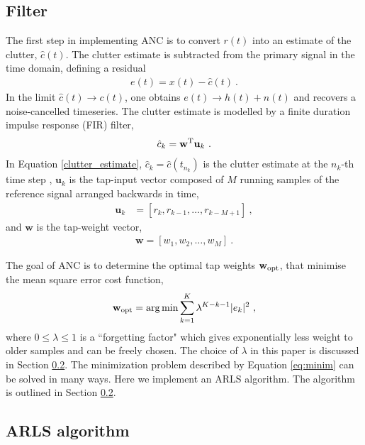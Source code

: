 \documentclass[pra,superscriptaddress,reprint,amsmath,amssymb,nofootinbib]{revtex4-2}
\begin{document}
\subsection{Filter}

The first step in implementing ANC is to convert $r(t)$ into an estimate of the clutter, $\hat{c}(t)$. The clutter estimate is subtracted from the primary signal in the time domain, defining a residual
\begin{eqnarray}
	e(t) = x(t) - \hat{c}(t) \ .\label{eq:error_estimate}
\end{eqnarray}
In the limit $\hat{c}(t) \to c(t)$, one obtains	$e(t) \to h(t) + n(t)$ and recovers a noise-cancelled timeseries. The clutter estimate is modelled by a finite duration impulse response (FIR) filter,
\begin{eqnarray}
	\hat{c}_k = \mathbf{w}^{\rm T}\mathbf{u}_k \ . \label{clutter_estimate}
\end{eqnarray}
In Equation \eqref{clutter_estimate}, ${\hat c}_k = {\hat c}(t_{n_k})$ is the clutter estimate at the $n_k$-th time step , $\mathbf{u}_k$ is the tap-input vector composed of $M$ running samples of the reference signal arranged backwards in time,
 \begin{eqnarray}
 	\mathbf{u}_k &= [r_k, r_{k-1}, \dots, r_{k-M+1}] \ ,
 \end{eqnarray}
and $\mathbf{w}$ is the tap-weight vector,
 \begin{eqnarray}
	\mathbf{w} = [w_1, w_{2}, \dots, w_{M}] \ .
\end{eqnarray}

The goal of ANC is to determine the optimal tap weights $\mathbf{w}_{\rm opt}$, that minimise the mean square error cost function,
\begin{eqnarray}
	\mathbf{w}_{\rm opt} = \arg \min \sum_{k=1}^{K} \lambda^{K-k-1} |e_k|^2 \ , \label{eq:minim}
\end{eqnarray}
where $0 \leq \lambda \leq 1$ is a ``forgetting factor" which gives exponentially less weight to older samples and can be freely chosen. The choice of $\lambda$ in this paper is discussed in Section \ref{sec:ARLS}. The minimization problem described by Equation \eqref{eq:minim} can be solved in many ways. Here we implement an ARLS algorithm. The algorithm is outlined in Section \ref{sec:ARLS}.

\subsection{ARLS algorithm}
\label{sec:ARLS}
\end{document}
